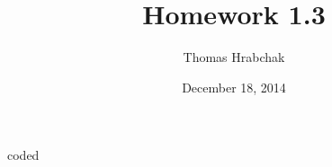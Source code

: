 \documentclass[10pt,a4paper]{article}
\title{Homework 1.3}
\author{Thomas Hrabchak}
\date{December 18, 2014}
\newenvironment{problem}[2][Problem]{\begin{trivlist}
  \item[\hskip \labelsep {\bfseries #1}\hskip \labelsep {\bfseries #2}]}{\end{trivlist}}
\begin{document}
\maketitle

\begin{problem}{1.3.37} coded
\end{problem}
\end{document}

